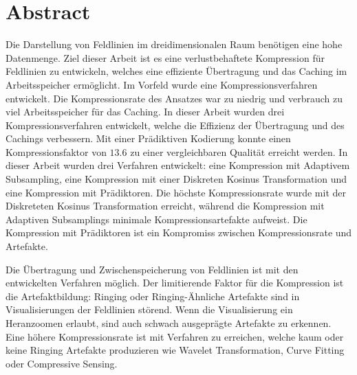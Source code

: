 \section*{Abstract}
Die Darstellung von Feldlinien im dreidimensionalen Raum benötigen eine hohe Datenmenge. Ziel dieser Arbeit ist es eine verlustbehaftete Kompression für Feldlinien zu entwickeln, welches eine effiziente Übertragung und das Caching im Arbeitsspeicher ermöglicht. Im Vorfeld wurde eine Kompressionsverfahren entwickelt. Die Kompressionsrate des Ansatzes war zu niedrig und verbrauch zu viel Arbeitsspeicher für das Caching. In dieser Arbeit wurden drei Kompressionsverfahren entwickelt, welche die Effizienz der Übertragung und des Cachings verbessern. Mit einer Prädiktiven Kodierung konnte einen Kompressionsfaktor von $13.6$ zu einer vergleichbaren Qualität erreicht werden.
In dieser Arbeit wurden drei Verfahren entwickelt: eine Kompression mit Adaptivem Subsampling, eine Kompression mit einer Diskreten Kosinus Transformation und eine Kompression mit Prädiktoren. Die höchste Kompressionsrate wurde mit der Diskreteten Kosinus Transformation erreicht, während die Kompression mit Adaptiven Subsamplings minimale Kompressionsartefakte aufweist. Die Kompression mit Prädiktoren ist ein Kompromiss zwischen Kompressionsrate und Artefakte.

Die Übertragung und Zwischenspeicherung von Feldlinien ist mit den entwickelten Verfahren möglich. Der limitierende Faktor für die Kompression ist die Artefaktbildung: Ringing oder Ringing-Ähnliche Artefakte sind in Visualisierungen der Feldlinien störend. Wenn die Visualisierung ein Heranzoomen erlaubt, sind auch schwach ausgeprägte Artefakte zu erkennen. Eine höhere Kompressionsrate ist mit Verfahren zu erreichen, welche kaum oder keine Ringing Artefakte produzieren wie Wavelet Transformation, Curve Fitting oder Compressive Sensing.